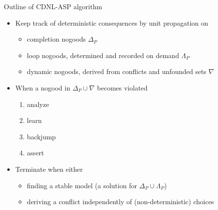 \begin{frame}{Outline of CDNL-ASP algorithm}
  \begin{itemize}
  \item<2-> \alert<3>{Keep track} of deterministic consequences by \alert<3>{unit propagation} on
    \begin{itemize}
    \item completion nogoods                                         \hfill $\Delta_P$
    \item loop nogoods, determined and recorded \alert<3>{on demand} \hfill $\Lambda_P$\kern 1pt
    \item dynamic nogoods, derived from conflicts and unfounded sets \hfill $\nabla\phantom{_P}$
    \end{itemize}
  \item<5-> When a nogood in $\Delta_P\cup\nabla$ becomes \alert<4>{violated}
    \begin{enumerate}
    \item<6-> \alert<6-10>{analyze}
    \item<6-> \alert<6-10>{learn}
    \item<6-> \alert<6-10>{backjump}
    \item<6-> \alert<6-10>{assert}
    \end{enumerate}
    \item<16-> Terminate when either
    \begin{itemize}
    \item<17-> finding a stable model (a solution for $\Delta_P\cup\Lambda_P$)
    \item<18-> deriving a conflict independently of (non-deterministic) choices
    \end{itemize}
  \end{itemize}
\end{frame}
